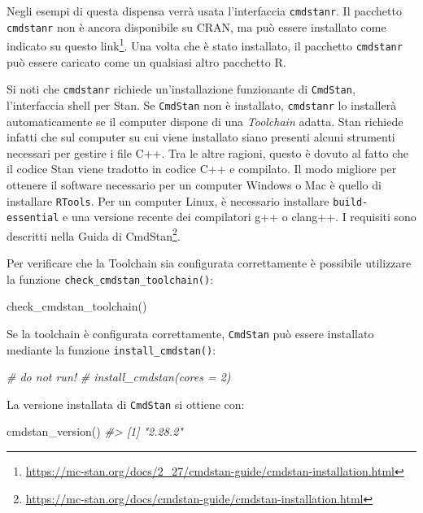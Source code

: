 \documentclass[
  11pt,
]{krantz}
\makeatletter
\newenvironment{Shaded}{\begin{snugshade}}{\end{snugshade}}
\newcommand{\CommentTok}[1]{\textcolor[rgb]{0.37,0.37,0.37}{\textit{#1}}}
\newcommand{\FunctionTok}[1]{\textcolor[rgb]{0,0,0}{#1}}
\newcommand{\NormalTok}[1]{#1}
\renewcommand{\href}[2]{#2\footnote{\url{#1}}}
\newenvironment{kframe}{%
\medskip{}
\setlength{\fboxsep}{.8em}
 \def\at@end@of@kframe{}%
 \ifinner\ifhmode%
  \def\at@end@of@kframe{\end{minipage}}%
  \begin{minipage}{\columnwidth}%
 \fi\fi%
 \def\FrameCommand##1{\hskip\@totalleftmargin \hskip-\fboxsep
 \colorbox{shadecolor}{##1}\hskip-\fboxsep
     \hskip-\linewidth \hskip-\@totalleftmargin \hskip\columnwidth}%
 \MakeFramed {\advance\hsize-\width
   \@totalleftmargin\z@ \linewidth\hsize
   \@setminipage}}%
 {\par\unskip\endMakeFramed%
 \at@end@of@kframe}
\renewenvironment{Shaded}{\begin{kframe}}{\end{kframe}}
\theoremstyle{definition}
\theoremstyle{definition}
\theoremstyle{definition}
\theoremstyle{definition}
\theoremstyle{remark}
\makeatother
\begin{document}
Negli esempi di questa dispensa verrà usata l'interfaccia \texttt{cmdstanr}. Il pacchetto \texttt{cmdstanr} non è ancora disponibile su CRAN, ma può essere installato come indicato su questo \href{https://mc-stan.org/docs/2_27/cmdstan-guide/cmdstan-installation.html}{link}. Una volta che è stato installato, il pacchetto \texttt{cmdstanr} può essere caricato come un qualsiasi altro pacchetto R.

Si noti che \texttt{cmdstanr} richiede un'installazione funzionante di \texttt{CmdStan}, l'interfaccia shell per Stan. Se \texttt{CmdStan} non è installato, \texttt{cmdstanr} lo installerà automaticamente se il computer dispone di una \emph{Toolchain} adatta. Stan richiede infatti che sul computer su cui viene installato siano presenti alcuni strumenti necessari per gestire i file C++. Tra le altre ragioni, questo è dovuto al fatto che il codice Stan viene tradotto in codice C++ e compilato. Il modo migliore per ottenere il software necessario per un computer Windows o Mac è quello di installare \texttt{RTools}. Per un computer Linux, è necessario installare \texttt{build-essential} e una versione recente dei compilatori g++ o clang++. I requisiti sono descritti nella \href{https://mc-stan.org/docs/cmdstan-guide/cmdstan-installation.html}{Guida di CmdStan}.

Per verificare che la Toolchain sia configurata correttamente è possibile utilizzare la funzione \texttt{check\_cmdstan\_toolchain()}:

\begin{Shaded}
\begin{Highlighting}[]
\FunctionTok{check\_cmdstan\_toolchain}\NormalTok{()}
\end{Highlighting}
\end{Shaded}

Se la toolchain è configurata correttamente, \texttt{CmdStan} può essere installato mediante la funzione \texttt{install\_cmdstan()}:

\begin{Shaded}
\begin{Highlighting}[]
\CommentTok{\# do not run!}
\CommentTok{\# install\_cmdstan(cores = 2)}
\end{Highlighting}
\end{Shaded}

La versione installata di \texttt{CmdStan} si ottiene con:

\begin{Shaded}
\begin{Highlighting}[]
\FunctionTok{cmdstan\_version}\NormalTok{()}
\CommentTok{\#\textgreater{} [1] "2.28.2"}
\end{Highlighting}
\end{Shaded}
\end{document}
